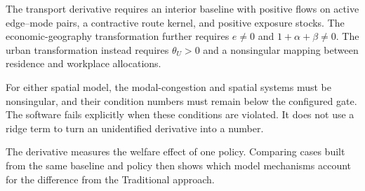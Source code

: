 The transport derivative requires an interior baseline with positive flows on
active edge--mode pairs, a contractive route kernel, and positive exposure
stocks. The economic-geography transformation further requires \(e\neq0\) and
\(1+\alpha+\beta\neq0\). The urban transformation instead requires
\(\theta_U>0\) and a nonsingular mapping between residence and workplace
allocations.

For either spatial model, the modal-congestion and spatial systems must be
nonsingular, and their condition numbers must remain below the configured
gate.
The software fails explicitly when these conditions are violated. It does not
use a ridge term to turn an unidentified derivative into a number.

The derivative measures the welfare effect of one policy. Comparing cases built
from the same baseline and policy then shows which model mechanisms account
for the difference from the Traditional approach.
